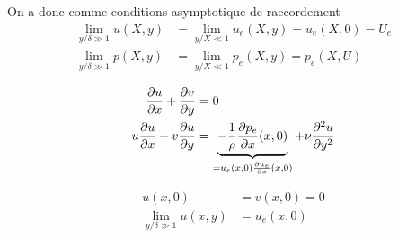       On a donc comme conditions asymptotique de raccordement
      \begin{equation}
        \begin{aligned}
          \lim_{y/\delta \gg 1} u(X, y) &= \lim_{y/X \ll 1} u_e(X, y) = u_e(X, 0) = U_e\\
          \lim_{y/\delta \gg 1} p(X, y) &= \lim_{y/X \ll 1} p_e(X, y) = p_e(X, U)
        \end{aligned}
      \end{equation}
      \begin{multicols}{2}
        \begin{equation*}
          \begin{aligned}
            \pdv{u}{x} + \pdv{v}{y} &= 0\\
            u \pdv{u}{x} + v\pdv{u}{y} &= \underbrace{-\frac{1}{\rho}{\pdv{p_e}{x}}(x, 0)}_{=u_e(x, 0){\pdv{u_e}{x}}(x,0)} + \nu\pdv[2]{u}{y}
          \end{aligned}
        \end{equation*}

        \begin{equation}
          \begin{aligned}
            u(x, 0) &= v(x, 0) = 0\\
            \lim_{y/\delta \gg 1} u(x, y) &= u_e(x, 0)
          \end{aligned}
        \end{equation}
      \end{multicols}

